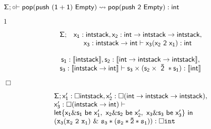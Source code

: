 \documentclass[10pt]{book}
\begin{document}
\begin{mdSnippets}
\begin{mdInlineSnippet}[7b6f56cb9f8ad56e908b92d5cc3a7c1f]%
${\sf \Sigma}; {\sf \circ {\vdash pop (push \ (1+1) \ Empty)\rightsquigarrow pop (push \ 2 \ Empty) :int}}$\end{mdInlineSnippet}%
\begin{mdInlineSnippet}[c4ca4238a0b923820dcc509a6f75849b]%
$1$\end{mdInlineSnippet}%
\begin{mdDisplaySnippet}[755ee2f1c61ac8644c13fb9e310eebf4]%
\[%
\begin{array}{c c}
{\sf \Sigma;}&  {\sf x_1:intstack,  x_2:int\rightarrow intstack\rightarrow intstack,}\\
&  {\sf x_3:intstack\rightarrow int \vdash   x_3 (x_2 \ 2\  x_1):int} 
\end{array}
\]%
\end{mdDisplaySnippet}%
\begin{mdDisplaySnippet}%
\[%
\begin{array}{c}
{\sf s_1:\llbracket intstack\rrbracket,  s_2:\llbracket int\rightarrow intstack\rightarrow intstack\rrbracket},\\
{\sf s_3:\llbracket intstack\rightarrow int \rrbracket \vdash   s_3 \times (s_2 \times \ \bar{2}\ * s_1):\llbracket int\rrbracket} 
\end{array}
\]%
\end{mdDisplaySnippet}%
\begin{mdInlineSnippet}[c3880bc63c2b0fd10cdc024cf76a1924]%
$\Box$\end{mdInlineSnippet}%
\begin{mdDisplaySnippet}[ad876f09899194c52ba4252a80fbe94e]%
\[%
\begin{array}{l}
{\sf \Sigma}; {\sf {x_1^{\prime}:\Box intstack ,x_2^{\prime}:\Box(int\rightarrow intstack\rightarrow intstack)}},\\
   {\sf x_3^{\prime}: \Box  (intstack\rightarrow int)}\vdash \\
        {\sf  let\{ x_1\& s_1 {\ \sf be \ } x_1^{\prime},
         \ x_2\& s_2 {\ \sf be \ } x_2^{\prime}, \  x_3\& s_3 
         {\ \sf be \ } x_3^{\prime} \}\  in}\ \\   
         \mathtt{(x_3 (x_2\ 2 \ x_1)\ \& \ s_3*(s_2* \bar{2}*s_1)):\Box int} 
\end{array}
\]
\end{mdDisplaySnippet}
\end{mdSnippets}
\end{document}
